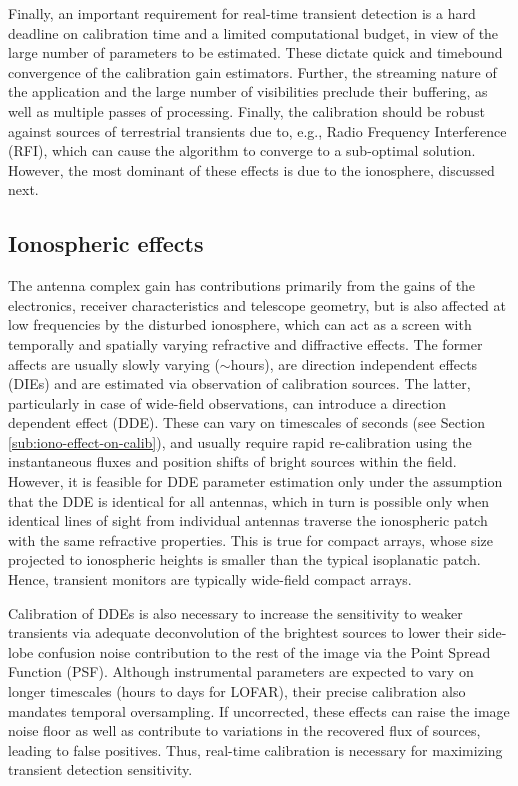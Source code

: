 \documentclass{aa}
\begin{document}
Finally, an  important requirement for  real-time transient detection is  a hard
deadline on calibration time and a  limited computational budget, in view of the
large number of  parameters to be estimated.  These  dictate quick and timebound
convergence of  the calibration gain estimators.  Further,  the streaming nature
of  the  application  and  the  large  number  of  visibilities  preclude  their
buffering, as well  as multiple passes of processing.   Finally, the calibration
should be robust  against sources of terrestrial transients  due to, e.g., Radio
Frequency Interference  (RFI), which  can cause the  algorithm to converge  to a
sub-optimal solution.  However, the most dominant of these effects is due to the
ionosphere, discussed next.

\subsection{\label{sub:All-Sky-cal-iono}Ionospheric effects}

The  antenna complex  gain has  contributions primarily  from the  gains  of the
electronics,  receiver  characteristics  and  telescope geometry,  but  is  also
affected at  low frequencies  by the  disturbed ionosphere, which  can act  as a
screen with temporally and spatially varying refractive and diffractive effects.
The  former affects  are  usually slowly  varying  ($\sim$hours), are  direction
independent  effects (DIEs)  and are  estimated via  observation  of calibration
sources.  The  latter, particularly  in  case  of  wide-field observations,  can
introduce a direction  dependent effect (DDE).  These can  vary on timescales of
seconds (see Section  \ref{sub:iono-effect-on-calib}), and usually require rapid
re-calibration  using the  instantaneous fluxes  and position  shifts  of bright
sources within the field.  However,  it is feasible for DDE parameter estimation
only under the  assumption that the DDE is identical for  all antennas, which in
turn is  possible only  when identical lines  of sight from  individual antennas
traverse the  ionospheric patch  with the same  refractive properties.   This is
true for compact arrays, whose  size projected to ionospheric heights is smaller
than  the typical isoplanatic  patch.  Hence,  transient monitors  are typically
wide-field compact arrays.

Calibration  of DDEs is  also necessary  to increase  the sensitivity  to weaker
transients via  adequate deconvolution of  the brightest sources to  lower their
side-lobe confusion  noise contribution to the  rest of the image  via the Point
Spread Function (PSF).  Although instrumental parameters are expected to vary on
longer  timescales (hours  to days  for LOFAR),  their precise  calibration also
mandates  temporal oversampling.  If uncorrected,  these effects  can  raise the
image noise floor  as well as contribute to variations in  the recovered flux of
sources, leading  to false positives.  Thus, real-time  calibration is necessary
for maximizing transient detection sensitivity.
\end{document}
